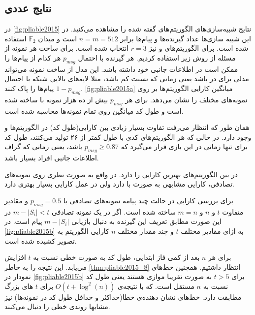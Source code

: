   \subsection{
  نتایج عددی
  }
  \label{subsection:numerical}
  در
  \autoref{fig:pliable2015}
  نتایج شبیه‌‌سازی‌های الگوریتم‌های گفته شده را مشاهده می‌کنید. در این شبیه سازی‌ها عداد گیرنده‌ها و پیام‌ها برابر
  $n = m = 512$
  است و میدان
  $\mathbb{F}_2$
  استفاده شده است. برای الگوریتم‌های
  و
  نیز
  $r = 3$
  انتخاب شده است. برای ساخت هر نمونه از مسئله از روش زیر استفاده کردیم. هر گیرنده با احتمال
  $p_{msg}$
  هر کدام از پیام‌ها را ممکن است در اطلاعات جانبی خود داشته باشد. این مدل از ساخت نمونه می‌تواند مدلی برای 
  در 
   باشد یعنی زمانی که نسبت 
کم باشد، مثلا لایه‌های بالایی شبکه با احتمال
$1 - p_{msg}$
پیام‌ها را پاک کنند.
\autoref{fig:pliable2015a}
میانگین کارایی الگوریتم‌ها بر روی نمونه‌های مختلف را نشان می‌دهد. برای هر 
$p_{msg}$
بیش از ده هزار نمونه با ساخته شده است و طول کد میانگین روی تمام نمونه‌ها محاسبه شده است.

همان طور که انتظار می‌رفت تفاوت بسیار زیادی بین کارایی(طول کد) در الگوریتم‌ها
\picod
و
\icod
وجود دارد. در حالی که هر الگوریتم‌های
کدی با طول کمتر از ۲۶ تولید می‌کنند، طول کد برای
\icod
تنها زمانی در این بازی قرار می‌گیرد که
$p_{msg} \geq 0.87$
باشد، یعنی زمانی که گراف اطلاعات جانبی افراد بسیار
  باشد.
  
  در بین الگوریتم‌های 
  \picod
  بهترین کارایی را دارد. در واقع
     به صورت نظری روی نمونه‌های تصادفی، کارایی مشابهی به صورت 
    با
    دارد ولی در عمل کارایی بسیار بهتری دارد.
    
    برای بررسی کارایی
        در حالت چند پیامه
        نمونه‌های تصادفی با
        $p_{msg} = 0.5$
        و مقادیر متفاوت
        $t$
        و
        $n$
        و
        $m = n$
        ساخته شده است. اگر در یک نمونه‌ تصادفی
        $m - |S_i| < t$
        در این صورت مطابق تعریف این گیرنده به دنبال بازیابی
        $m - |S_i|$
        پیام است. در
        \autoref{fig:pliable2015b}
        به ازای مقادیر مختلف
        $t$
        و چند مقدار مختلف
        $n$
        کارایی الگوریتم به تصویر کشیده شده است.
        
        برای هر
        $n$
        بعد از کمی فاز ابتدایی، طول کد به صورت خطی نسبت به
        $t$
        افزایش می‌یابد. این نتیجه را به خاطر
        \autoref{thm:pliable2015_8}
        انتظار داشتیم. همچنین خط‌های نمودار در
                \autoref{fig:pliable2015b}
                برای
                $t > 5$
                به صورت تقریبا موازی هستند یعنی طول کد نسبت به 
                $n$
                مستقل است. که با نتیجه‌ی
                $O(t + \log^2(n))$
                برای
                $t$
                های بزرگ مطابقت دارد. خط‌های نشان دهنده‌ی خطا(حداکثر و حداقل طول کد در نمونه‌ها) نیز مشابها روندی خطی را دنبال می‌کنند.
                
